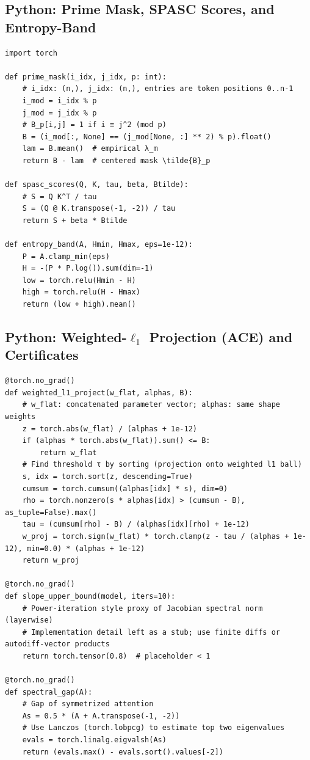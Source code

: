 \documentclass[11pt]{article}
\theoremstyle{definition}
\theoremstyle{remark}
\begin{document}
\subsection*{Python: Prime Mask, SPASC Scores, and Entropy-Band}
\begin{lstlisting}[style=spasc,caption={Prime mask, centered density, SPASC-biased scores and entropy-band penalty.}]
import torch

def prime_mask(i_idx, j_idx, p: int):
    # i_idx: (n,), j_idx: (n,), entries are token positions 0..n-1
    i_mod = i_idx % p
    j_mod = j_idx % p
    # B_p[i,j] = 1 if i ≡ j^2 (mod p)
    B = (i_mod[:, None] == (j_mod[None, :] ** 2) % p).float()
    lam = B.mean()  # empirical λ_m
    return B - lam  # centered mask \tilde{B}_p

def spasc_scores(Q, K, tau, beta, Btilde):
    # S = Q K^T / tau
    S = (Q @ K.transpose(-1, -2)) / tau
    return S + beta * Btilde

def entropy_band(A, Hmin, Hmax, eps=1e-12):
    P = A.clamp_min(eps)
    H = -(P * P.log()).sum(dim=-1)
    low = torch.relu(Hmin - H)
    high = torch.relu(H - Hmax)
    return (low + high).mean()
\end{lstlisting}

\subsection*{Python: Weighted-$\ell_1$ Projection (ACE) and Certificates}
\begin{lstlisting}[style=spasc,caption={ACE projection onto weighted-ℓ1 ball and simple certificate stubs.}]
@torch.no_grad()
def weighted_l1_project(w_flat, alphas, B):
    # w_flat: concatenated parameter vector; alphas: same shape weights
    z = torch.abs(w_flat) / (alphas + 1e-12)
    if (alphas * torch.abs(w_flat)).sum() <= B:
        return w_flat
    # Find threshold τ by sorting (projection onto weighted l1 ball)
    s, idx = torch.sort(z, descending=True)
    cumsum = torch.cumsum((alphas[idx] * s), dim=0)
    rho = torch.nonzero(s * alphas[idx] > (cumsum - B), as_tuple=False).max()
    tau = (cumsum[rho] - B) / (alphas[idx][rho] + 1e-12)
    w_proj = torch.sign(w_flat) * torch.clamp(z - tau / (alphas + 1e-12), min=0.0) * (alphas + 1e-12)
    return w_proj

@torch.no_grad()
def slope_upper_bound(model, iters=10):
    # Power-iteration style proxy of Jacobian spectral norm (layerwise)
    # Implementation detail left as a stub; use finite diffs or autodiff-vector products
    return torch.tensor(0.8)  # placeholder < 1

@torch.no_grad()
def spectral_gap(A):
    # Gap of symmetrized attention
    As = 0.5 * (A + A.transpose(-1, -2))
    # Use Lanczos (torch.lobpcg) to estimate top two eigenvalues
    evals = torch.linalg.eigvalsh(As)
    return (evals.max() - evals.sort().values[-2])
\end{lstlisting}
\end{document}
